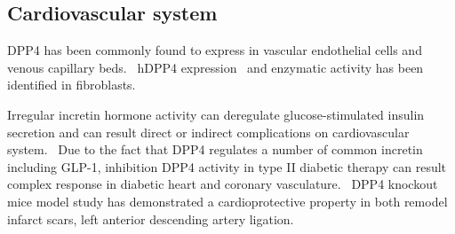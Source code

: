 \subsection{Cardiovascular system}
DPP4 has been commonly found to express in vascular endothelial cells and venous capillary beds.~\cite{Matheeussen2013,Shigeta2012} hDPP4 expression~\cite{Nemoto1999} and enzymatic activity has been identified in fibroblasts.~\cite{Ospelt2010}
\par 
Irregular incretin hormone activity can deregulate glucose-stimulated insulin secretion and can result direct or indirect complications on cardiovascular system.~\cite{Ussher2012} Due to the fact that DPP4 regulates a number of common incretin including GLP-1, inhibition DPP4 activity in type II diabetic therapy can result complex response in diabetic heart and coronary vasculature.~\cite{Ussher2014} DPP4 knockout mice model study has demonstrated a cardioprotective property in both remodel infarct scars, left anterior descending artery ligation. 